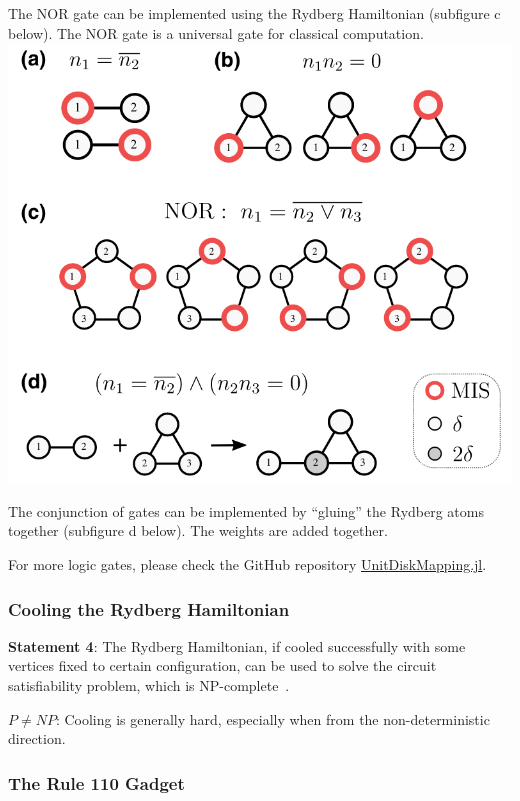 \documentclass[twocolumn,superscriptaddress,english,showpacs,longbibliography]{revtex4-2}
\begin{document}
The NOR gate can be implemented using the Rydberg Hamiltonian (subfigure
c below). The NOR gate is a universal gate for classical computation.
\includegraphics[width=\columnwidth]{../notes/images/gadgets.png}

The conjunction of gates can be implemented by ``gluing'' the Rydberg
atoms together (subfigure d below). The weights are added together.

For more logic gates, please check the GitHub repository
\href{https://github.com/QuEraComputing/UnitDiskMapping.jl/blob/main/test/logicgates.jl}{UnitDiskMapping.jl}.

\subsubsection{Cooling the Rydberg Hamiltonian}\label{cooling-the-rydberg-hamiltonian}

\textbf{Statement 4}: The Rydberg Hamiltonian, if cooled successfully
with some vertices fixed to certain configuration, can be used to solve
the circuit satisfiability problem, which is NP-complete~\cite{Moore2011}.

$P \neq NP$: Cooling is generally hard, especially when from the
non-deterministic direction.

\subsubsection{The Rule 110 Gadget}\label{the-rule-110-gadget}
\end{document}
